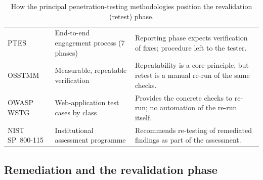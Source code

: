 \begin{table}[htbp]
\caption[Treatment of revalidation in penetration-testing standards]{How the principal penetration-testing methodologies position the revalidation (retest) phase.}
\label{tab:standards}
\footnotesize
\renewcommand{\arraystretch}{1.3}
\begin{center}
\begin{tabular}{|L{3.2cm}|L{4.2cm}|L{5.6cm}|}
\hline
{}
 &  &  \\ \hline
PTES & End-to-end engagement process (7 phases) & Reporting phase expects verification of fixes; procedure left to the tester. \\ \hline
OSSTMM & Measurable, repeatable verification & Repeatability is a core principle, but retest is a manual re-run of the same checks. \\ \hline
OWASP WSTG & Web-application test cases by class & Provides the concrete checks to re-run; no automation of the re-run itself. \\ \hline
NIST SP~800-115 & Institutional assessment programme & Recommends re-testing of remediated findings as part of the assessment. \\ \hline
\end{tabular}
\end{center}
\renewcommand{\arraystretch}{1}
\end{table}

\subsection{Remediation and the revalidation phase}
\label{subsec:revalidation}

